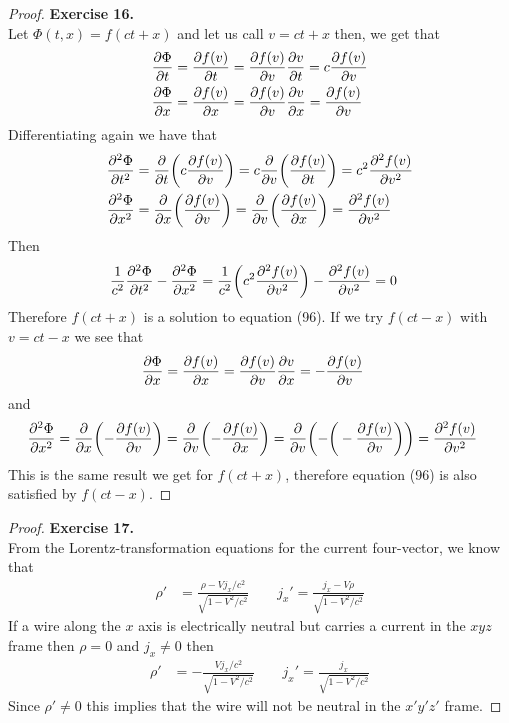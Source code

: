 \documentclass[11pt]{article}
\theoremstyle{definition}
\begin{document}
\cleardoublepage
\begin{proof}{\textbf{Exercise 16.}}\\
Let $\Phi(t,x) = f(ct + x)$ and let us call $v = ct + x$ then, we get that
\begin{align*}
    \pdv{\Phi}{t} &= \pdv{f(v)}{t} = \pdv{f(v)}{v}\pdv{v}{t} = c\pdv{f(v)}{v} \\
    \pdv{\Phi}{x} &= \pdv{f(v)}{x} = \pdv{f(v)}{v}\pdv{v}{x} = \pdv{f(v)}{v}
\end{align*}
Differentiating again we have that
\begin{align*}
    \pdv[2]{\Phi}{t} &= \pdv{t}(c\pdv{f(v)}{v})
    = c\pdv{v}(\pdv{f(v)}{t})
    = c^2\pdv[2]{f(v)}{v} \\
    \pdv[2]{\Phi}{x} &= \pdv{x}(\pdv{f(v)}{v})
    = \pdv{v}(\pdv{f(v)}{x})
    = \pdv[2]{f(v)}{v}
\end{align*}
Then
\begin{align*}
    \frac{1}{c^2}\pdv[2]{\Phi}{t} - \pdv[2]{\Phi}{x} &=
    \frac{1}{c^2}\bigg(c^2\pdv[2]{f(v)}{v}\bigg) - \pdv[2]{f(v)}{v}
    = 0
\end{align*}
Therefore $f(ct + x)$ is a solution to equation (96). If we try $f(ct - x)$
with $v = ct - x$ we see that
\begin{align*}
    \pdv{\Phi}{x} &= \pdv{f(v)}{x} = \pdv{f(v)}{v}\pdv{v}{x} = -\pdv{f(v)}{v}
\end{align*}
and
\begin{align*}
    \pdv[2]{\Phi}{x} &= \pdv{x}(-\pdv{f(v)}{v})
    = \pdv{v}(-\pdv{f(v)}{x})
    = \pdv{v}(-\bigg(-\pdv{f(v)}{v}\bigg))
    = \pdv[2]{f(v)}{v}
\end{align*}
This is the same result we get for $f(ct + x)$, therefore equation (96)
is also satisfied by $f(ct - x)$.

\end{proof}

\cleardoublepage
\begin{proof}{\textbf{Exercise 17.}}\\
From the Lorentz-transformation equations for the current four-vector, we know
that
\begin{align*}
    \rho' &= \frac{\rho - Vj_x /c^2}{\sqrt{1 - V^2/c^2}} \qquad
    j_x' = \frac{j_x - V\rho}{\sqrt{1 - V^2/c^2}}
\end{align*}
If a wire along the $x$ axis is electrically neutral but carries a current in
the $xyz$ frame then $\rho = 0$ and $j_x \neq 0$ then
\begin{align*}
    \rho' &= -\frac{Vj_x /c^2}{\sqrt{1 - V^2/c^2}} \qquad
    j_x' = \frac{j_x}{\sqrt{1 - V^2/c^2}}
\end{align*}
Since $\rho' \neq 0$ this implies that the wire will not be neutral in the
$x'y'z'$ frame.
\end{proof}
\end{document}
